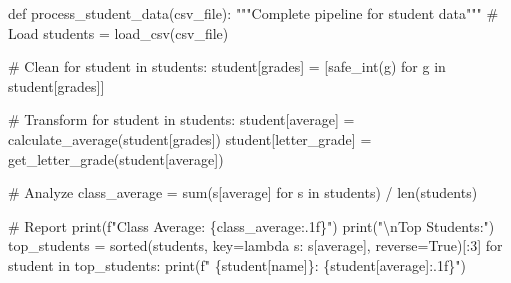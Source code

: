 \documentclass[
  letterpaper,
  DIV=11,
  numbers=noendperiod,
  oneside]{scrreprt}
\newenvironment{Shaded}{}{}
\newcommand{\BuiltInTok}[1]{\textcolor[rgb]{0.84,0.23,0.29}{#1}}
\newcommand{\CharTok}[1]{\textcolor[rgb]{0.01,0.18,0.38}{#1}}
\newcommand{\CommentTok}[1]{\textcolor[rgb]{0.42,0.45,0.49}{#1}}
\newcommand{\ControlFlowTok}[1]{\textcolor[rgb]{0.84,0.23,0.29}{#1}}
\newcommand{\DecValTok}[1]{\textcolor[rgb]{0.00,0.36,0.77}{#1}}
\newcommand{\KeywordTok}[1]{\textcolor[rgb]{0.84,0.23,0.29}{#1}}
\newcommand{\NormalTok}[1]{\textcolor[rgb]{0.14,0.16,0.18}{#1}}
\newcommand{\OperatorTok}[1]{\textcolor[rgb]{0.14,0.16,0.18}{#1}}
\newcommand{\SpecialCharTok}[1]{\textcolor[rgb]{0.00,0.36,0.77}{#1}}
\newcommand{\SpecialStringTok}[1]{\textcolor[rgb]{0.01,0.18,0.38}{#1}}
\newcommand{\StringTok}[1]{\textcolor[rgb]{0.01,0.18,0.38}{#1}}
\newcommand{\VariableTok}[1]{\textcolor[rgb]{0.89,0.38,0.04}{#1}}
\begin{document}
\begin{Shaded}
\begin{Highlighting}[]
\KeywordTok{def}\NormalTok{ process\_student\_data(csv\_file):}
    \CommentTok{"""Complete pipeline for student data"""}
    \CommentTok{\# Load}
\NormalTok{    students }\OperatorTok{=}\NormalTok{ load\_csv(csv\_file)}
    
    \CommentTok{\# Clean}
    \ControlFlowTok{for}\NormalTok{ student }\KeywordTok{in}\NormalTok{ students:}
\NormalTok{        student[}\StringTok{\textquotesingle{}grades\textquotesingle{}}\NormalTok{] }\OperatorTok{=}\NormalTok{ [safe\_int(g) }\ControlFlowTok{for}\NormalTok{ g }\KeywordTok{in}\NormalTok{ student[}\StringTok{\textquotesingle{}grades\textquotesingle{}}\NormalTok{]]}
    
    \CommentTok{\# Transform}
    \ControlFlowTok{for}\NormalTok{ student }\KeywordTok{in}\NormalTok{ students:}
\NormalTok{        student[}\StringTok{\textquotesingle{}average\textquotesingle{}}\NormalTok{] }\OperatorTok{=}\NormalTok{ calculate\_average(student[}\StringTok{\textquotesingle{}grades\textquotesingle{}}\NormalTok{])}
\NormalTok{        student[}\StringTok{\textquotesingle{}letter\_grade\textquotesingle{}}\NormalTok{] }\OperatorTok{=}\NormalTok{ get\_letter\_grade(student[}\StringTok{\textquotesingle{}average\textquotesingle{}}\NormalTok{])}
    
    \CommentTok{\# Analyze}
\NormalTok{    class\_average }\OperatorTok{=} \BuiltInTok{sum}\NormalTok{(s[}\StringTok{\textquotesingle{}average\textquotesingle{}}\NormalTok{] }\ControlFlowTok{for}\NormalTok{ s }\KeywordTok{in}\NormalTok{ students) }\OperatorTok{/} \BuiltInTok{len}\NormalTok{(students)}
    
    \CommentTok{\# Report}
    \BuiltInTok{print}\NormalTok{(}\SpecialStringTok{f"Class Average: }\SpecialCharTok{\{}\NormalTok{class\_average}\SpecialCharTok{:.1f\}}\SpecialStringTok{"}\NormalTok{)}
    \BuiltInTok{print}\NormalTok{(}\StringTok{"}\CharTok{\textbackslash{}n}\StringTok{Top Students:"}\NormalTok{)}
\NormalTok{    top\_students }\OperatorTok{=} \BuiltInTok{sorted}\NormalTok{(students, key}\OperatorTok{=}\KeywordTok{lambda}\NormalTok{ s: s[}\StringTok{\textquotesingle{}average\textquotesingle{}}\NormalTok{], reverse}\OperatorTok{=}\VariableTok{True}\NormalTok{)[:}\DecValTok{3}\NormalTok{]}
    \ControlFlowTok{for}\NormalTok{ student }\KeywordTok{in}\NormalTok{ top\_students:}
        \BuiltInTok{print}\NormalTok{(}\SpecialStringTok{f"  }\SpecialCharTok{\{}\NormalTok{student[}\StringTok{\textquotesingle{}name\textquotesingle{}}\NormalTok{]}\SpecialCharTok{\}}\SpecialStringTok{: }\SpecialCharTok{\{}\NormalTok{student[}\StringTok{\textquotesingle{}average\textquotesingle{}}\NormalTok{]}\SpecialCharTok{:.1f\}}\SpecialStringTok{"}\NormalTok{)}
\end{Highlighting}
\end{Shaded}
\end{document}
